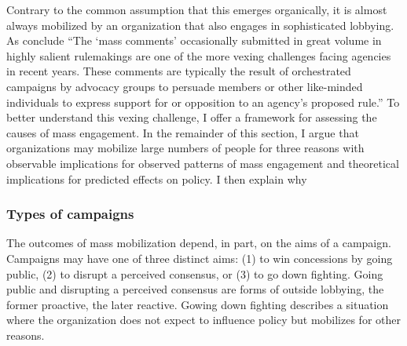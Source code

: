 Contrary to the common assumption that this emerges organically, it is almost always mobilized by an organization that also engages in sophisticated lobbying. %
As \citet{SantAmbrogio2018} conclude ``The `mass comments' occasionally submitted in great volume in highly salient
rulemakings are one of the more vexing challenges facing agencies in recent years. These comments are typically the result of orchestrated campaigns by advocacy groups to persuade members or other like-minded individuals to express support for or opposition to an agency's proposed rule.'' %
To better understand this vexing challenge, I offer a framework for assessing the causes of mass engagement. In the remainder of this section, I argue that organizations may mobilize large numbers of people for three reasons with observable implications for observed patterns of mass engagement and theoretical implications for predicted effects on policy. I then explain why 

\subsubsection{Types of campaigns} The outcomes of mass mobilization depend, in part, on the aims of a campaign. Campaigns may have one of three distinct aims: (1) to win concessions by going public, (2) to disrupt a perceived consensus, or (3) to go down fighting. Going public and disrupting a perceived consensus are forms of outside lobbying, the former proactive, the later reactive. Gowing down fighting describes a situation where the organization does not expect to influence policy but mobilizes for other reasons. 

